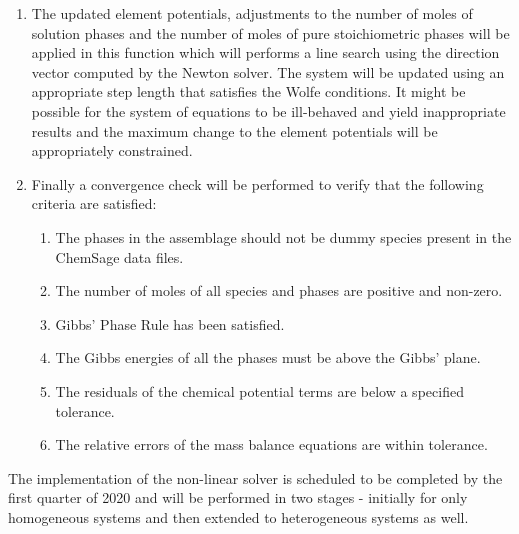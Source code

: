 \begin{enumerate}
			\item The updated element potentials, adjustments to the number of moles of solution phases and the number of moles of pure stoichiometric phases will be applied in this function which will performs a line search using the direction vector computed by the Newton solver.  The system will be updated using an appropriate step length that satisfies the Wolfe conditions.  It might be possible for the system of equations to be ill-behaved and yield inappropriate results and the maximum change to the element potentials will be appropriately constrained.
			 \item Finally a convergence check will be performed to verify that the following criteria are satisfied:
			 \begin{enumerate}
			 	\item The phases in the assemblage should not be dummy species present in the ChemSage data files.
				\item The number of moles of all species and phases are positive and non-zero.
				\item Gibbs' Phase Rule has been satisfied.
				\item The Gibbs energies of all the phases must be above the Gibbs' plane.
				\item The residuals of the chemical potential terms are below a specified tolerance.
				\item The relative errors of the mass balance equations are within tolerance.
			\end{enumerate}
		\end{enumerate}
	The implementation of the non-linear solver is scheduled to be completed by the first quarter of 2020 and will be performed in two stages - initially for only homogeneous systems and then extended to heterogeneous systems as well.
	
